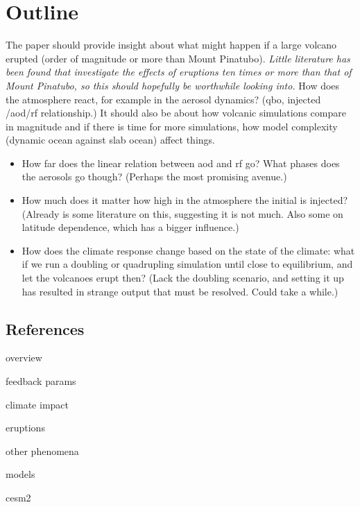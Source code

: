 \documentclass[twocol]{ametsocV5}
\newcommand{\iso}[1][i]{{#1}njected \ce{SO2}}
\begin{document}
\section{Outline}

The paper should provide insight about what might happen if a large volcano erupted
(order of magnitude or more than Mount Pinatubo). \emph{Little literature has been found
  that investigate the effects of eruptions ten times or more than that of Mount Pinatubo,
  so this should hopefully be worthwhile looking into.} How does the atmosphere react, for
example in the aerosol dynamics? (\acrshort{qbo}, \iso{}/\acrshort{aod}/\acrshort{rf}
relationship.) It should also be about how volcanic simulations compare in magnitude and
if there is time for more simulations, how model complexity (dynamic ocean against slab
ocean) affect things.
\begin{itemize}
  \item How far does the linear relation between \acrshort{aod} and \acrshort{rf} go? What
        phases does the aerosols go though? (Perhaps the most promising avenue.)
  \item How much does it matter how high in the atmosphere the initial  is injected?
        (Already is some literature on this, suggesting it is not much. Also some on latitude
        dependence, which has a bigger influence.)
  \item How does the climate response change based on the state of the climate: what if we run a
         doubling or quadrupling simulation until close to equilibrium, and let the
        volcanoes erupt then? (Lack the doubling scenario, and setting it up has resulted in
        strange output that must be resolved. Could take a while.)
\end{itemize}

\subsection*{References}

\begin{description}
  \item[overview] \citet{marshall2022}
  \item[feedback params] \citet{boer2007, bender2010, gunther2022, gregory2020, hansen2005,
      knutti2017, marvel2016, merlis2014, ollila2016, pauling2021, pauling2023,
      richardson2019, salvi2022, wigley2005}
  \item[climate impact] \citet{gregory2016, jones2005, ottobliesner2016, santer2016,
      timmreck2009, timmreck2010, yang2019, yokohata2005, zanchettin2019}
  \item[eruptions] \citet{arfeuille2014, douglass2006, kleinschmitt2018, marshall2019,
      marshall2020, marshall2021, niemeier2015, niemeier2017, pitari2016b, soden2002,
      sukhodolov2018, tilmes2017}
  \item[other phenomena] \citet{chen2022, lehner2016, marshall2018}
  \item[models] \citet{rypdal2012}
  \item[cesm2] \citet{danabasoglu2020, gettleman2019, lawrence2019, li2013, liu2016, mills2016,
      smith2010}
\end{description}
\end{document}
